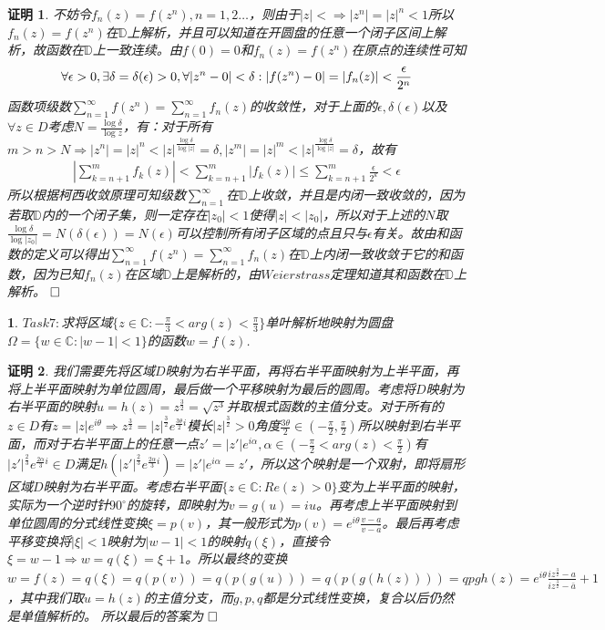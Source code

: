 \documentclass{ctexart}
\newcommand{\。}{．} %
\newenvironment{lanse}{
    \begin{tcolorbox}[breakable,enhanced, colback=qlan, boxrule=0pt, frame hidden,
        borderline west={0.7mm}{0.1mm}{slan}]
    }
    {\end{tcolorbox}}
\newenvironment{zise}{
    \begin{tcolorbox}[breakable,enhanced, colback=qzi, boxrule=0pt, frame hidden,
        borderline west={0.7mm}{0.1mm}{szi}]
    }
    {\end{tcolorbox}}
\theoremstyle{t} %
\newtheorem*{zmhj}{\color{slan} 证明}
\newtheorem*{smhj}{\color{slan} }
\newenvironment{zm}{\begin{lanse}\begin{zmhj}}{$\hfill \square$\end{zmhj}\end{lanse}}
\newenvironment{sm}{\begin{zise}\begin{smhj}}{\end{smhj}\end{zise}}
\begin{document}
\begin{zm}
    不妨令$f_n(z)=f(z^n),n=1,2\dots$，则由于$|z|<\Rightarrow |z^n|=|z|^n<1$所以$f_n(z)=f(z^n)$在$\mathbb{D}$上解析，并且可以知道在开圆盘的任意一个闭子区间上解析，故函数在$\mathbb{D}$上一致连续。由$f(0)=0$和$f_n(z)=f(z^n)$在原点的连续性可知
    \begin{align*}
        \forall \epsilon>0,\space \exists \delta=\delta(\epsilon)>0,\space \forall |z^n-0|<\delta: |f(z^n)-0|=|f_n(z)|<\frac{\epsilon}{2^n}
    \end{align*}
    函数项级数$\sum_{n=1}^{\infty}f(z^n)=\sum_{n=1}^{\infty}f_n(z)$的收敛性，对于上面的$\epsilon,\delta(\epsilon)$以及$\forall z\in D$考虑$N=\frac{\log \delta}{\log z}$，有：对于所有$m>n>N\Rightarrow |z^n|=|z|^n<|z|^{\frac{\log \delta}{\log |z|}}=\delta,|z^m|=|z|^m<|z|^{\frac{\log \delta}{\log |z|}}=\delta$，故有
    \begin{align*}
        \left|\sum_{k=n+1}^{m}f_k(z)\right|<\sum_{k=n+1}^{m}\left|f_k(z)\right|\le \sum_{k=n+1}^{m}\frac{\epsilon}{2^k}<\epsilon
    \end{align*}
    所以根据柯西收敛原理可知级数$\sum_{n=1}^{\infty}$在$\mathbb{D}$上收敛，并且是内闭一致收敛的，因为若取$\mathbb{D}$内的一个闭子集，则一定存在$|z_0|<1$使得$|z|<|z_0|$，所以对于上述的$N$取$\frac{\log\delta}{\log |z_0|}=N(\delta(\epsilon))=N(\epsilon)$可以控制所有闭子区域的点且只与$\epsilon$有关。故由和函数的定义可以得出$\sum_{n=1}^{\infty}f(z^n)=\sum_{n=1}^{\infty}f_n(z)$在$\mathbb{D}$上内闭一致收敛于它的和函数，因为已知$f_n(z)$在区域$\mathbb{D}$上是解析的，由$Weierstrass$定理知道其和函数在$\mathbb{D}$上解析。
\end{zm}
\begin{sm}
    $Task7:$求将区域$\{z\in\mathbb{C}:-\frac{\pi}{3}<arg(z)<\frac{\pi}{3}\}$单叶解析地映射为圆盘$\Omega=\{w\in\mathbb{C}:|w-1|<1\}$的函数$w=f(z)$.
\end{sm}
\begin{zm}
    我们需要先将区域$D$映射为右半平面，再将右半平面映射为上半平面，再将上半平面映射为单位圆周，最后做一个平移映射为最后的圆周。考虑将$D$映射为右半平面的映射$u=h(z)=z^{\frac{3}{2}}=\sqrt{z^3}$并取根式函数的主值分支。对于所有的$z\in D$有$z=|z|e^{i\theta}\Rightarrow z^{\frac{3}{2}}=|z|^{\frac{3}{2}}e^{\frac{3\theta}{2}i}$模长$|z|^{\frac{3}{2}}>0$角度$\frac{3\theta}{2}\in(-\frac{\pi}{2},\frac{\pi}{2})$所以映射到右半平面，而对于右半平面上的任意一点$z'=|z'|e^{i\alpha},\alpha\in (-\frac{\pi}{2}<arg(z)<\frac{\pi}{2})$有$|z'|^{\frac{2}{3}}e^{\frac{2\alpha}{3}i}\in D$满足$h(|z'|^{\frac{2}{3}}e^{\frac{2\alpha}{3}i})=|z'|e^{i\alpha}=z'$，所以这个映射是一个双射，即将扇形区域$D$映射为右半平面。考虑右半平面$\{z\in\mathbb{C}:Re(z)>0\}$变为上半平面的映射，实际为一个逆时针$90^\circ$的旋转，即映射为$v=g(u)=iu$。再考虑上半平面映射到单位圆周的分式线性变换$\xi=p(v)$，其一般形式为$p(v)=e^{i\theta}\frac{v-a}{v-\bar{a}}$。最后再考虑平移变换将$|\xi|<1$映射为$|w-1|<1$的映射$q(\xi)$，直接令$\xi=w-1\Rightarrow w=q(\xi)=\xi+1$。所以最终的变换$w=f(z)=q(\xi)=q(p(v))=q(p(g(u)))=q(p(g(h(z))))=qpgh(z)=e^{i\theta}\frac{iz^{\frac{3}{2}}-a}{iz^{\frac{3}{2}}-\bar{a}}+1$，其中我们取$u=h(z)$的主值分支，而$g,p,q$都是分式线性变换，复合以后仍然是单值解析的。
    所以最后的答案为
\end{zm}
\end{document}
